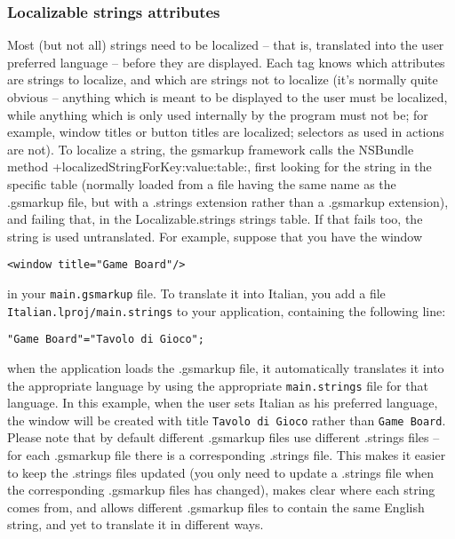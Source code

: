 \subsubsection{Localizable strings attributes}
Most (but not all) strings need to be localized -- that is, translated
into the user preferred language -- before they are displayed.  Each
tag knows which attributes are strings to localize, and which are
strings not to localize (it's normally quite obvious -- anything which
is meant to be displayed to the user must be localized, while anything
which is only used internally by the program must not be; for example,
window titles or button titles are localized; selectors as used in
actions are not).  To localize a string, the gsmarkup framework calls the
NSBundle method +localizedStringForKey:value:table:, first looking for
the string in the specific table (normally loaded from a file having
the same name as the .gsmarkup file, but with a .strings extension rather
than a .gsmarkup extension), and failing that, in the Localizable.strings
strings table.  If that fails too, the string is used untranslated.
For example, suppose that you have the window
\begin{verbatim}
<window title="Game Board"/>
\end{verbatim}
in your \texttt{main.gsmarkup} file.  To translate it into Italian, you
add a file \texttt{Italian.lproj/main.strings} to your application,
containing the following line:
\begin{verbatim}
"Game Board"="Tavolo di Gioco";
\end{verbatim}
when the application loads the .gsmarkup file, it automatically translates
it into the appropriate language by using the appropriate
\texttt{main.strings} file for that language.  In this example, when the
user sets Italian as his preferred language, the window will be
created with title \texttt{Tavolo di Gioco} rather than \texttt{Game
Board}.  Please note that by default different .gsmarkup files use
different .strings files -- for each .gsmarkup file there is a
corresponding .strings file.  This makes it easier to keep the
.strings files updated (you only need to update a .strings file when
the corresponding .gsmarkup files has changed), makes clear where each
string comes from, and allows different .gsmarkup files to contain the
same English string, and yet to translate it in different ways.

